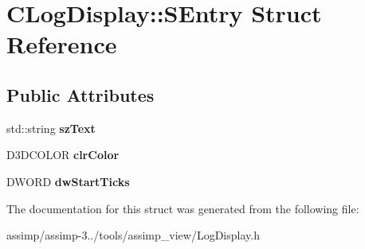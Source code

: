 \hypertarget{struct_c_log_display_1_1_s_entry}{\section{C\+Log\+Display\+:\+:S\+Entry Struct Reference}
\label{struct_c_log_display_1_1_s_entry}
}
\subsection*{Public Attributes}
\begin{DoxyCompactItemize}
\item 
\hypertarget{struct_c_log_display_1_1_s_entry_afe8e76b0560028ad487fca598f1532b4}{std\+::string {\bfseries sz\+Text}}\label{struct_c_log_display_1_1_s_entry_afe8e76b0560028ad487fca598f1532b4}

\item 
\hypertarget{struct_c_log_display_1_1_s_entry_a455fa8d483b95db8b43c01eb81b4ae59}{D3\+D\+C\+O\+L\+O\+R {\bfseries clr\+Color}}\label{struct_c_log_display_1_1_s_entry_a455fa8d483b95db8b43c01eb81b4ae59}

\item 
\hypertarget{struct_c_log_display_1_1_s_entry_ad805ae4083c6b92dcdd157b7982ff25f}{D\+W\+O\+R\+D {\bfseries dw\+Start\+Ticks}}\label{struct_c_log_display_1_1_s_entry_ad805ae4083c6b92dcdd157b7982ff25f}

\end{DoxyCompactItemize}


The documentation for this struct was generated from the following file\+:\begin{DoxyCompactItemize}
\item 
assimp/assimp-\/3../tools/assimp\+\_\+view/Log\+Display.\+h\end{DoxyCompactItemize}
